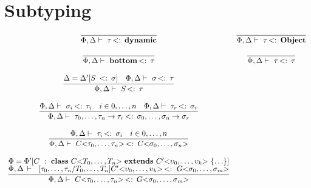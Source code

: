 \documentclass[fleqn]{article}
\newcommand{\Arrow}[2]{#1 \rightarrow #2}
\newcommand{\Bottom}{\mathbf{bottom}}
\newcommand{\Dynamic}{\mathbf{dynamic}}
\newcommand{\Object}{\mathbf{Object}}
\newcommand{\TApp}[2]{#1\mathrm{<}#2\mathrm{>}}
\newcommand{\kwclass}{\mathbf{class}}
\newcommand{\kwextends}{\mathbf{extends}}
\newcommand{\dclass}[3]{\kwclass\ #1\ \kwextends\ #2\ \{#3\}}
\newcommand{\sub}{\mathop{<:}}
\newcommand{\axiom}[1]{\infer{#1}{}}
\newcommand{\infrule}[2]{\infer{#2}{#1}}
\newcommand{\extends}[4][:]{#2[#3\ #1\ #4]}
\newcommand{\subst}[2]{[#1/#2]}
\newcommand{\subtypeOf}[3]{#1 \vdash\ #2 \sub\ #3}
\begin{document}
\section*{Subtyping}
\[
\begin{array}{ccc}
\axiom{\subtypeOf{\Phi, \Delta}{\tau}{\Dynamic}} &
\axiom{\subtypeOf{\Phi, \Delta}{\tau}{\Object}} \\\\
%
\axiom{\subtypeOf{\Phi, \Delta}{\Bottom}{\tau}} &
\axiom{\subtypeOf{\Phi, \Delta}{\tau}{\tau}} \\\\
%
\infrule{\Delta = \extends[\sub]{\Delta'}{S}{\sigma} & 
         \subtypeOf{\Phi, \Delta}{\sigma}{\tau}}
        {\subtypeOf{\Phi, \Delta}{S}{\tau}} \\\\
%
\infrule{\subtypeOf{\Phi, \Delta}{\sigma_i}{\tau_i} & i \in 0, \ldots, n &
         \subtypeOf{\Phi, \Delta}{\tau_r}{\sigma_r}}
        {\subtypeOf{\Phi, \Delta}
                   {\Arrow{\tau_0, \ldots, \tau_n}{\tau_r}}
                   {\Arrow{\sigma_0, \ldots, \sigma_n}{\sigma_r}}} \\\\
%
\infrule{\subtypeOf{\Phi, \Delta}{\tau_i}{\sigma_i} & i \in 0, \ldots, n}
        {\subtypeOf{\Phi, \Delta}
          {\TApp{C}{\tau_0, \ldots, \tau_n}}
          {\TApp{C}{\sigma_0, \ldots, \sigma_n}}}\\\\
%
\infrule{\Phi = \extends{\Phi'}{C}{\dclass{\TApp{C}{T_0,\ldots,T_n}}{\TApp{C'}{\upsilon_0, \ldots, \upsilon_k}}{\ldots}} \\
         \subtypeOf{\Phi, \Delta}{\subst{\tau_0, \ldots, \tau_n}{T_0, \ldots, T_n}{\TApp{C'}{\upsilon_0, \ldots, \upsilon_k}}}{\TApp{G}{\sigma_0, \ldots, \sigma_m}}}
        {\subtypeOf{\Phi, \Delta}
          {\TApp{C}{\tau_0, \ldots, \tau_n}}
          {\TApp{G}{\sigma_0, \ldots, \sigma_m}}}
\end{array}
\]
\end{document}

